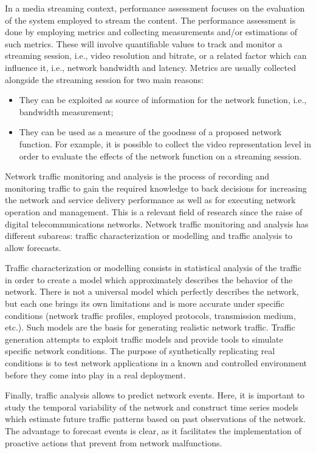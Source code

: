 In a media streaming context, performance assessment focuses on the evaluation of the system employed to stream the content. The performance assessment is done by employing metrics and collecting measurements and/or estimations of such metrics. %
These will involve quantifiable values to track and monitor a streaming session, i.e., video resolution and bitrate, or a related factor which can influence it, i.e., network bandwidth and latency. Metrics are usually collected alongside the streaming session for two main reasons:
\begin{itemize}
	\item They can be exploited as source of information for the network function, i.e., bandwidth measurement;
	\item They can be used as a measure of the goodness of a proposed network function. For example, it is possible to collect the video representation level in order to evaluate the effects of the network function on a streaming session.
\end{itemize}

Network traffic monitoring and analysis is the process of recording and monitoring traffic to gain the required knowledge to back decisions for increasing the network and service delivery performance as well as for executing network operation and management. This is a relevant field of research since the raise of digital telecommunications networks. Network traffic monitoring and analysis has different subareas: traffic characterization or modelling and traffic analysis to allow forecasts.

Traffic characterization or modelling consists in statistical analysis of the traffic in order to create a model which approximately describes the behavior of the network. There is not a universal model which perfectly describes the network, but each one brings its own limitations and is more accurate under specific conditions (network traffic profiles, employed protocols, transmission medium, etc.). Such models are the basis for generating realistic network traffic. Traffic generation attempts to exploit traffic models and provide tools to simulate specific network conditions. The purpose of synthetically replicating real conditions is to test network applications in a known and controlled environment before they come into play in a real deployment.

Finally, traffic analysis allows to predict network events. Here, it is important to study the temporal variability of the network and construct time series models which estimate future traffic patterns based on past observations of the network. The advantage to forecast events is clear, as it facilitates the implementation of proactive actions that prevent from network malfunctions.

